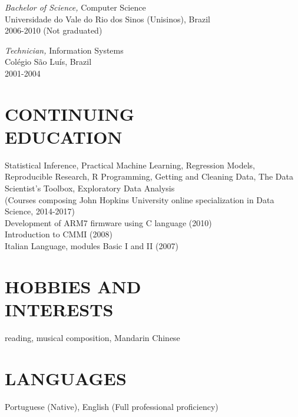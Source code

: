 \documentclass[line,margin]{res}
\begin{document}
\begin{resume}
                   {\sl Bachelor of Science,} Computer Science \\
                Universidade do Vale do Rio dos Sinos (Unisinos), Brazil \\
                2006-2010 (Not graduated)

                   {\sl Technician,} Information Systems \\
                Colégio São Luís, Brazil \\
                2001-2004
	
\section{CONTINUING \\ EDUCATION} Statistical Inference, Practical Machine Learning, Regression Models, Reproducible Research, 
                                    R Programming, Getting and Cleaning Data, The Data Scientist's Toolbox, Exploratory Data Analysis\\
                                    (Courses composing John Hopkins University online specialization in Data Science, 2014-2017)\\
                                  Development of ARM7 firmware using C language (2010) \\
                                  Introduction to CMMI (2008) \\
                                  Italian Language, modules Basic I and II (2007)

\section{HOBBIES AND \\ INTERESTS} reading, musical composition, Mandarin Chinese

\section{LANGUAGES} Portuguese (Native), English (Full professional proficiency)
 
\end{resume}
\end{document}
